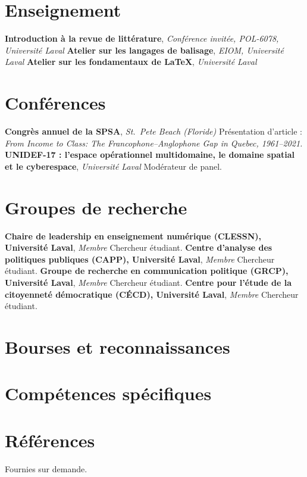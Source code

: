 \documentclass[10pt,letterpaper]{article}
\begin{document}
\section*{Enseignement}
  {\textbf{Introduction à la revue de littérature}, \textit{Conférence invitée, POL-6078, Université Laval}}{}
  {\textbf{Atelier sur les langages de balisage}, \textit{EIOM, Université Laval}}{}
  {\textbf{Atelier sur les fondamentaux de LaTeX}, \textit{Université Laval}}{}

\section*{Conférences}
  {\textbf{Congrès annuel de la SPSA}, \textit{St.\ Pete Beach (Floride)}}
  {Présentation d'article : \foreignlanguage{english}{\textit{From Income to Class: The Francophone--Anglophone Gap in Quebec, 1961--2021.}}}
  {\textbf{UNIDEF-17 : l'espace opérationnel multidomaine, le domaine spatial et le cyberespace}, \textit{Université Laval}}
  {Modérateur de panel.}

\section*{Groupes de recherche}
  {\textbf{Chaire de leadership en enseignement numérique (CLESSN), Université Laval}, \textit{Membre}}
  {Chercheur étudiant.}
  {\textbf{Centre d'analyse des politiques publiques (CAPP), Université Laval}, \textit{Membre}}
  {Chercheur étudiant.}
  {\textbf{Groupe de recherche en communication politique (GRCP), Université Laval}, \textit{Membre}}
  {Chercheur étudiant.}
  {\textbf{Centre pour l'étude de la citoyenneté démocratique (CÉCD), Université Laval}, \textit{Membre}}
  {Chercheur étudiant.}

\section*{Bourses et reconnaissances}

\section*{Compétences spécifiques}

\section*{Références}
Fournies sur demande.
\end{document}
